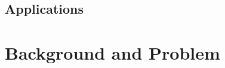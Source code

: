 \documentclass{article}
\begin{document}





\subsection{Applications}




\section{Background and Problem}

\end{document}

